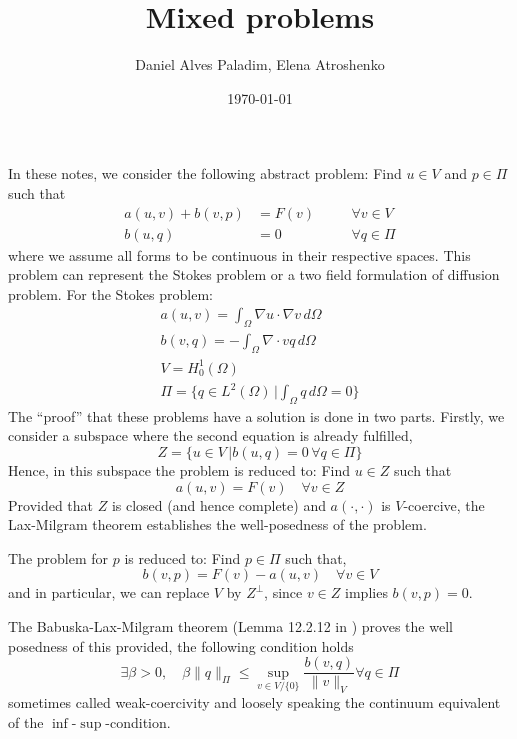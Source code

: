 \documentclass[a4paper,10pt]{article}
\title{Mixed problems}
\author{Daniel Alves Paladim, Elena Atroshenko}
\date{\today}
\begin{document}
\maketitle
  In these notes, we consider the following abstract problem: Find $u \in V$ and $p \in \Pi$ such that
  \begin{align}
    a(u,v)+ b(v,p) &= F(v) \quad &&\forall v \in V \label{eq:main}\\
            b(u,q) &= 0    \quad &&\forall q \in \Pi \label{eq:constraint}
  \end{align}
  where we assume all forms to be continuous in their respective spaces. This problem can represent the Stokes problem or a two field formulation of diffusion problem. For the Stokes problem:
  \begin{gather*}
   a(u,v) =  \int_\Omega \nabla u \cdot \nabla v \,d\Omega \\
   b(v,q) = -\int_\Omega \nabla \cdot v q \,d\Omega \\
   V = H^1_0(\Omega) \\
   \Pi = \{q \in L^2(\Omega) \,| \int_\Omega q \,d\Omega = 0  \}
  \end{gather*}
  The ``proof'' that these problems have a solution is done in two parts. Firstly, we consider a subspace where the second equation is already fulfilled,
  \begin{equation}
   Z = \{u \in V \,| b(u,q) = 0 \, \forall q \in \Pi\}
  \end{equation}
  Hence, in this subspace the problem is reduced to: Find $u \in Z$ such that
  \begin{equation}
   a(u,v) = F(v) \quad \forall v \in Z
  \end{equation}
  Provided that $Z$ is closed (and hence complete) and $a(\cdot,\cdot)$ is $V$-coercive, the Lax-Milgram theorem establishes the well-posedness of the problem.
  
  The problem for $p$ is reduced to: Find $p \in \Pi$ such that,
  \begin{equation}
   b(v,p) = F(v) - a(u,v) \quad \forall v \in V
  \end{equation}
  and in particular, we can replace $V$ by $Z^\perp$, since $v \in Z$ implies $b(v,p) = 0$.
  
  The Babuska-Lax-Milgram theorem (Lemma 12.2.12 in \cite{}) proves the well posedness of this provided, the following condition holds
  \begin{equation}
   \exists \beta > 0,\quad \beta \|q\|_\Pi \leq \sup_{v \in V/\{0\}} \frac{b(v,q)}{\|v\|_V} \forall q \in \Pi
  \end{equation}
  sometimes called weak-coercivity and loosely speaking the continuum equivalent of the $\inf$-$\sup$-condition.
  
\end{document}
